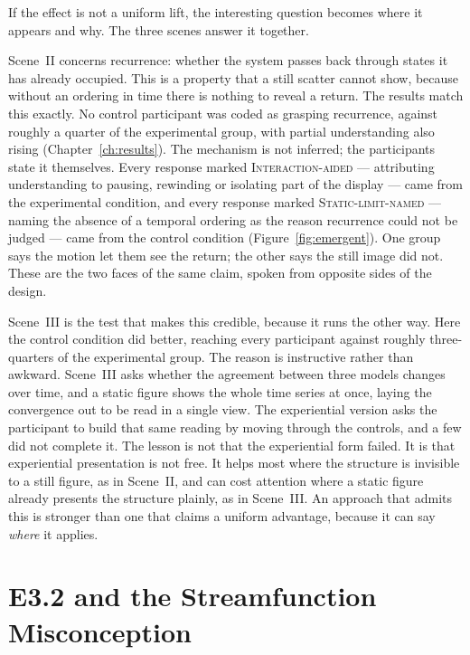 If the effect is not a uniform lift, the interesting question becomes where it appears and why. The three scenes answer it together.

Scene~II concerns recurrence: whether the system passes back through states it has already occupied. This is a property that a still scatter cannot show, because without an ordering in time there is nothing to reveal a return. The results match this exactly. No control participant was coded as grasping recurrence, against roughly a quarter of the experimental group, with partial understanding also rising (Chapter~\ref{ch:results}). The mechanism is not inferred; the participants state it themselves. Every response marked \textsc{Interaction-aided} --- attributing understanding to pausing, rewinding or isolating part of the display --- came from the experimental condition, and every response marked \textsc{Static-limit-named} --- naming the absence of a temporal ordering as the reason recurrence could not be judged --- came from the control condition (Figure~\ref{fig:emergent}). One group says the motion let them see the return; the other says the still image did not. These are the two faces of the same claim, spoken from opposite sides of the design.

Scene~III is the test that makes this credible, because it runs the other way. Here the control condition did better, reaching every participant against roughly three-quarters of the experimental group. The reason is instructive rather than awkward. Scene~III asks whether the agreement between three models changes over time, and a static figure shows the whole time series at once, laying the convergence out to be read in a single view. The experiential version asks the participant to build that same reading by moving through the controls, and a few did not complete it. The lesson is not that the experiential form failed. It is that experiential presentation is not free. It helps most where the structure is invisible to a still figure, as in Scene~II, and can cost attention where a static figure already presents the structure plainly, as in Scene~III. An approach that admits this is stronger than one that claims a uniform advantage, because it can say \emph{where} it applies.

\section{E3.2 and the Streamfunction Misconception}
\label{sec:disc-e32}


